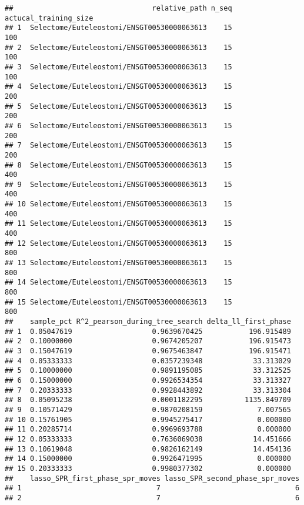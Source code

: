 \documentclass[
]{article}
\begin{document}
\begin{verbatim}
##                                 relative_path n_seq actucal_training_size
## 1  Selectome/Euteleostomi/ENSGT00530000063613    15                   100
## 2  Selectome/Euteleostomi/ENSGT00530000063613    15                   100
## 3  Selectome/Euteleostomi/ENSGT00530000063613    15                   100
## 4  Selectome/Euteleostomi/ENSGT00530000063613    15                   200
## 5  Selectome/Euteleostomi/ENSGT00530000063613    15                   200
## 6  Selectome/Euteleostomi/ENSGT00530000063613    15                   200
## 7  Selectome/Euteleostomi/ENSGT00530000063613    15                   200
## 8  Selectome/Euteleostomi/ENSGT00530000063613    15                   400
## 9  Selectome/Euteleostomi/ENSGT00530000063613    15                   400
## 10 Selectome/Euteleostomi/ENSGT00530000063613    15                   400
## 11 Selectome/Euteleostomi/ENSGT00530000063613    15                   400
## 12 Selectome/Euteleostomi/ENSGT00530000063613    15                   800
## 13 Selectome/Euteleostomi/ENSGT00530000063613    15                   800
## 14 Selectome/Euteleostomi/ENSGT00530000063613    15                   800
## 15 Selectome/Euteleostomi/ENSGT00530000063613    15                   800
##    sample_pct R^2_pearson_during_tree_search delta_ll_first_phase
## 1  0.05047619                   0.9639670425           196.915489
## 2  0.10000000                   0.9674205207           196.915473
## 3  0.15047619                   0.9675463847           196.915471
## 4  0.05333333                   0.0357239348            33.313029
## 5  0.10000000                   0.9891195085            33.312525
## 6  0.15000000                   0.9926534354            33.313327
## 7  0.20333333                   0.9928443892            33.313304
## 8  0.05095238                   0.0001182295          1135.849709
## 9  0.10571429                   0.9870208159             7.007565
## 10 0.15761905                   0.9945275417             0.000000
## 11 0.20285714                   0.9969693788             0.000000
## 12 0.05333333                   0.7636069038            14.451666
## 13 0.10619048                   0.9826162149            14.454136
## 14 0.15000000                   0.9926471995             0.000000
## 15 0.20333333                   0.9980377302             0.000000
##    lasso_SPR_first_phase_spr_moves lasso_SPR_second_phase_spr_moves
## 1                                7                                6
## 2                                7                                6

\end{verbatim}
\end{document}
